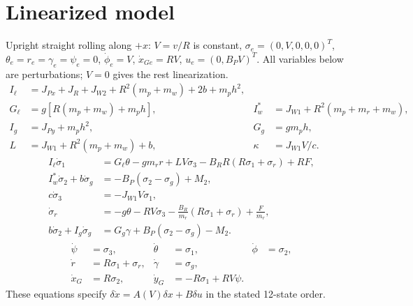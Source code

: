 \documentclass[10pt]{article}
\numberwithin{equation}{section}
\begin{document}
\section{Linearized model}
Upright straight rolling along $+x$: $V=v/R$ is constant,
$\sigma_e=(0,V,0,0,0)^T$, $\theta_e=r_e=\gamma_e=\psi_e=0$,
$\dot\phi_e=V$, $\dot x_{Ge}=RV$, $u_e=(0,B_PV)^T$.
All variables below are perturbations; $V=0$ gives the rest linearization.
\begin{equation}
\begin{aligned}
I_\ell&=J_{Px}+J_R+J_{W2}+R^2(m_p+m_w)+2b+m_ph^2,\\
G_\ell&=g[R(m_p+m_w)+m_ph],& I_w^*&=J_{W1}+R^2(m_p+m_r+m_w),\\
I_g&=J_{Py}+m_ph^2,&G_g&=gm_ph,\\
L&=J_{W1}+R^2(m_p+m_w)+b,&\kappa&=J_{W1}V/c.
\end{aligned}
\end{equation}
\begin{equation}
\begin{aligned}
I_\ell\dot\sigma_1&=G_\ell\theta-gm_r r+LV\sigma_3-B_RR(R\sigma_1+\sigma_r)+RF,\\
I_w^*\dot\sigma_2+b\dot\sigma_g&=-B_P(\sigma_2-\sigma_g)+M_2,\\
c\dot\sigma_3&=-J_{W1}V\sigma_1,\\
\dot\sigma_r&=-g\theta-RV\sigma_3-\frac{B_R}{m_r}(R\sigma_1+\sigma_r)+\frac{F}{m_r},\\
b\dot\sigma_2+I_g\dot\sigma_g&=G_g\gamma+B_P(\sigma_2-\sigma_g)-M_2.
\end{aligned}
\end{equation}
\begin{equation}
\begin{aligned}
\dot\psi&=\sigma_3,&\dot\theta&=\sigma_1,&\dot\phi&=\sigma_2,\\
\dot r&=R\sigma_1+\sigma_r,&\dot\gamma&=\sigma_g,\\
\dot x_G&=R\sigma_2,&\dot y_G&=-R\sigma_1+RV\psi.
\end{aligned}
\end{equation}
These equations specify $\delta\dot x=A(V)\delta x+B\delta u$ in the stated 12-state order.
\end{document}
